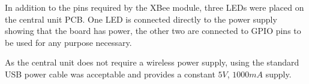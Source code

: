 In addition to the pins required by the XBee module, three LEDs were placed on the central unit PCB. One LED is connected directly to the power supply showing that the board has power, the other two are connected to GPIO pins to be used for any purpose necessary.

As the central unit does not require a wireless power supply, using the standard USB power cable was acceptable and provides a constant $5\unit{V}$, $1000\unit{mA}$ supply.
